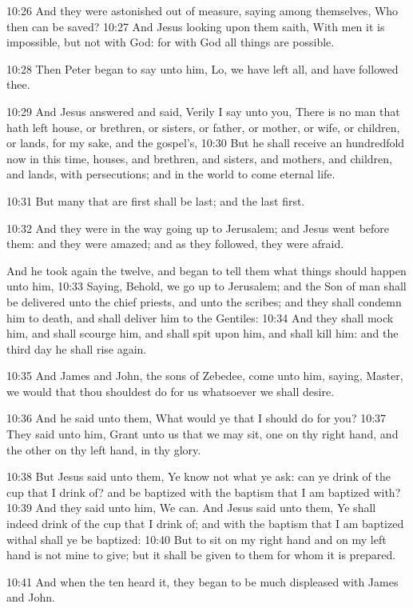 10:26 And they were astonished out of measure, saying among
themselves, Who then can be saved?  10:27 And Jesus looking upon them
saith, With men it is impossible, but not with God: for with God all
things are possible.

10:28 Then Peter began to say unto him, Lo, we have left all, and have
followed thee.

10:29 And Jesus answered and said, Verily I say unto you, There is no
man that hath left house, or brethren, or sisters, or father, or
mother, or wife, or children, or lands, for my sake, and the gospel's,
10:30 But he shall receive an hundredfold now in this time, houses,
and brethren, and sisters, and mothers, and children, and lands, with
persecutions; and in the world to come eternal life.

10:31 But many that are first shall be last; and the last first.

10:32 And they were in the way going up to Jerusalem; and Jesus went
before them: and they were amazed; and as they followed, they were
afraid.

And he took again the twelve, and began to tell them what things
should happen unto him, 10:33 Saying, Behold, we go up to Jerusalem;
and the Son of man shall be delivered unto the chief priests, and unto
the scribes; and they shall condemn him to death, and shall deliver
him to the Gentiles: 10:34 And they shall mock him, and shall scourge
him, and shall spit upon him, and shall kill him: and the third day he
shall rise again.

10:35 And James and John, the sons of Zebedee, come unto him, saying,
Master, we would that thou shouldest do for us whatsoever we shall
desire.

10:36 And he said unto them, What would ye that I should do for you?
10:37 They said unto him, Grant unto us that we may sit, one on thy
right hand, and the other on thy left hand, in thy glory.

10:38 But Jesus said unto them, Ye know not what ye ask: can ye drink
of the cup that I drink of? and be baptized with the baptism that I am
baptized with?  10:39 And they said unto him, We can. And Jesus said
unto them, Ye shall indeed drink of the cup that I drink of; and with
the baptism that I am baptized withal shall ye be baptized: 10:40 But
to sit on my right hand and on my left hand is not mine to give; but
it shall be given to them for whom it is prepared.

10:41 And when the ten heard it, they began to be much displeased with
James and John.

